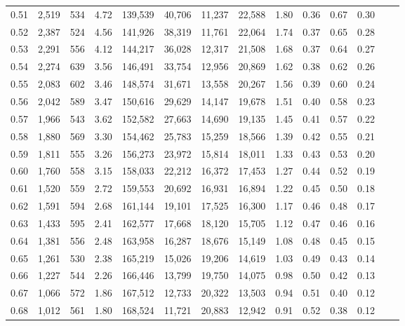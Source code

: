 \begin{tabular}{rrrrrrrrrrrrrr}
0.51 &  2,519 &  534 &    4.72 &  139,539 &   40,706 &  11,237 &  22,588 &  1.80 &  0.36 &  0.67 &      0.30 \\
0.52 &  2,387 &  524 &    4.56 &  141,926 &   38,319 &  11,761 &  22,064 &  1.74 &  0.37 &  0.65 &      0.28 \\
0.53 &  2,291 &  556 &    4.12 &  144,217 &   36,028 &  12,317 &  21,508 &  1.68 &  0.37 &  0.64 &      0.27 \\
0.54 &  2,274 &  639 &    3.56 &  146,491 &   33,754 &  12,956 &  20,869 &  1.62 &  0.38 &  0.62 &      0.26 \\
0.55 &  2,083 &  602 &    3.46 &  148,574 &   31,671 &  13,558 &  20,267 &  1.56 &  0.39 &  0.60 &      0.24 \\
0.56 &  2,042 &  589 &    3.47 &  150,616 &   29,629 &  14,147 &  19,678 &  1.51 &  0.40 &  0.58 &      0.23 \\
0.57 &  1,966 &  543 &    3.62 &  152,582 &   27,663 &  14,690 &  19,135 &  1.45 &  0.41 &  0.57 &      0.22 \\
0.58 &  1,880 &  569 &    3.30 &  154,462 &   25,783 &  15,259 &  18,566 &  1.39 &  0.42 &  0.55 &      0.21 \\
0.59 &  1,811 &  555 &    3.26 &  156,273 &   23,972 &  15,814 &  18,011 &  1.33 &  0.43 &  0.53 &      0.20 \\
0.60 &  1,760 &  558 &    3.15 &  158,033 &   22,212 &  16,372 &  17,453 &  1.27 &  0.44 &  0.52 &      0.19 \\
0.61 &  1,520 &  559 &    2.72 &  159,553 &   20,692 &  16,931 &  16,894 &  1.22 &  0.45 &  0.50 &      0.18 \\
0.62 &  1,591 &  594 &    2.68 &  161,144 &   19,101 &  17,525 &  16,300 &  1.17 &  0.46 &  0.48 &      0.17 \\
0.63 &  1,433 &  595 &    2.41 &  162,577 &   17,668 &  18,120 &  15,705 &  1.12 &  0.47 &  0.46 &      0.16 \\
0.64 &  1,381 &  556 &    2.48 &  163,958 &   16,287 &  18,676 &  15,149 &  1.08 &  0.48 &  0.45 &      0.15 \\
0.65 &  1,261 &  530 &    2.38 &  165,219 &   15,026 &  19,206 &  14,619 &  1.03 &  0.49 &  0.43 &      0.14 \\
0.66 &  1,227 &  544 &    2.26 &  166,446 &   13,799 &  19,750 &  14,075 &  0.98 &  0.50 &  0.42 &      0.13 \\
0.67 &  1,066 &  572 &    1.86 &  167,512 &   12,733 &  20,322 &  13,503 &  0.94 &  0.51 &  0.40 &      0.12 \\
0.68 &  1,012 &  561 &    1.80 &  168,524 &   11,721 &  20,883 &  12,942 &  0.91 &  0.52 &  0.38 &      0.12 \\

\end{tabular}
